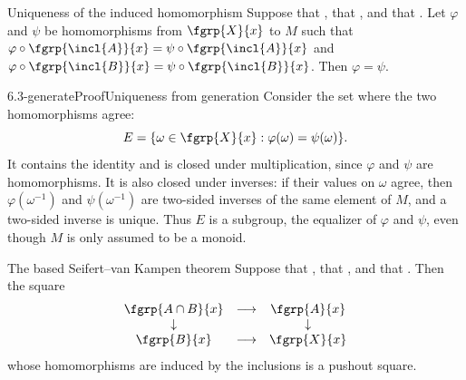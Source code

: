 \begin{proposition}[id=6.3]{Uniqueness of the induced homomorphism}
Suppose that \hypCoverTwo, that \hypPathConnected, and that \hypBasepoint.  Let
$\varphi$ and $\psi$ be homomorphisms from $\fgrp{X}{x}$ to $M$ such that
$\varphi \circ \fgrp{\incl{A}}{x} = \psi \circ \fgrp{\incl{A}}{x}$ and
$\varphi \circ \fgrp{\incl{B}}{x} = \psi \circ \fgrp{\incl{B}}{x}$.  Then
$\varphi = \psi$.
\end{proposition}

\begin{proofpassage}{6.3-generate}{Proof}{Uniqueness from generation}
Consider the set where the two homomorphisms agree:
\[
 E=\{\omega\in\fgrp{X}{x}:\varphi(\omega)=\psi(\omega)\}.
\]
It contains the identity and is closed under multiplication, since
$\varphi$ and $\psi$ are homomorphisms.  It is also closed under inverses:
if their values on $\omega$ agree, then $\varphi(\omega^{-1})$ and
$\psi(\omega^{-1})$ are two-sided inverses of the same element of $M$,
and a two-sided inverse is unique.  Thus $E$ is a subgroup, the equalizer of $\varphi$ and $\psi$, even
though $M$ is only assumed to be a monoid.

  
\end{proofpassage}

\begin{theorem}[id=6.4]{The based Seifert--van Kampen theorem}
Suppose that \hypCoverTwo, that \hypPathConnected, and that \hypBasepoint.  Then
the square
\[
  \begin{array}{ccc}
    \fgrp{A \cap B}{x} & \longrightarrow & \fgrp{A}{x} \\
    \downarrow & & \downarrow \\
    \fgrp{B}{x} & \longrightarrow & \fgrp{X}{x}
  \end{array}
\]
whose homomorphisms are induced by the inclusions is a pushout square.
\end{theorem}

